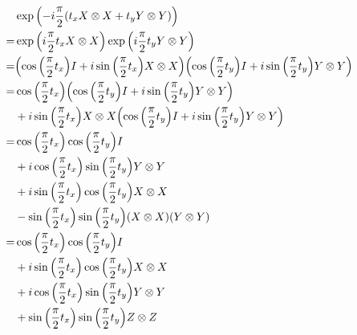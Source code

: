 \documentclass{article}
\begin{document}
\begin{align*}
  &\exp\pqty{-i\frac{\pi}{2}\pqty{t_x X\otimes X + t_y Y\otimes Y}} \\
  =& \exp\pqty{i\frac{\pi}{2}t_x X\otimes X} \exp\pqty{i\frac{\pi}{2}t_y Y\otimes Y} \\
  =& \pqty{\cos\pqty{\frac{\pi}{2}t_x} I + i\sin\pqty{\frac{\pi}{2}t_x} X\otimes X}
  \pqty{\cos\pqty{\frac{\pi}{2}t_y} I + i\sin\pqty{\frac{\pi}{2}t_y} Y\otimes Y} \\
  =& \cos\pqty{\frac{\pi}{2}t_x}\pqty{\cos\pqty{\frac{\pi}{2}t_y} I + i\sin\pqty{\frac{\pi}{2}t_y} Y\otimes Y} 
  \\&+
  i\sin\pqty{\frac{\pi}{2}t_x} X\otimes X\pqty{\cos\pqty{\frac{\pi}{2}t_y} I + i\sin\pqty{\frac{\pi}{2}t_y} Y\otimes Y}
  \\
  =& \cos\pqty{\frac{\pi}{2}t_x}\cos\pqty{\frac{\pi}{2}t_y} I
  \\&+ i\cos\pqty{\frac{\pi}{2}t_x}\sin\pqty{\frac{\pi}{2}t_y} Y\otimes Y 
  \\&+
  i\sin\pqty{\frac{\pi}{2}t_x} \cos\pqty{\frac{\pi}{2}t_y} X\otimes X
  \\&- \sin\pqty{\frac{\pi}{2}t_x} \sin\pqty{\frac{\pi}{2}t_y} \pqty{X\otimes X}\pqty{Y\otimes Y}
  \\
  =& \cos\pqty{\frac{\pi}{2}t_x}\cos\pqty{\frac{\pi}{2}t_y} I
  \\&+ i\sin\pqty{\frac{\pi}{2}t_x} \cos\pqty{\frac{\pi}{2}t_y} X\otimes X
  \\&+ i\cos\pqty{\frac{\pi}{2}t_x}\sin\pqty{\frac{\pi}{2}t_y} Y\otimes Y 
  \\&+ \sin\pqty{\frac{\pi}{2}t_x} \sin\pqty{\frac{\pi}{2}t_y} Z\otimes Z
  \\
\end{align*}
\end{document}

